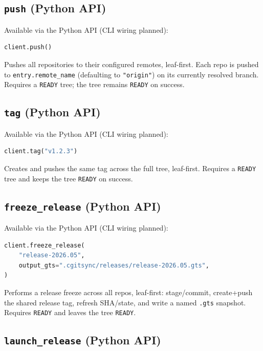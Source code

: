 \documentclass[11pt,a4paper]{article}
\begin{document}
\subsection{\texttt{push} (Python API)}

Available via the Python API (CLI wiring planned):

\begin{lstlisting}[language=Python]
client.push()
\end{lstlisting}

Pushes all repositories to their configured remotes, leaf-first.  Each repo
is pushed to \texttt{entry.remote\_name} (defaulting to \texttt{"origin"}) on
its currently resolved branch.  Requires a \texttt{READY} tree; the tree
remains \texttt{READY} on success.

\subsection{\texttt{tag} (Python API)}

Available via the Python API (CLI wiring planned):

\begin{lstlisting}[language=Python]
client.tag("v1.2.3")
\end{lstlisting}

Creates and pushes the same tag across the full tree, leaf-first. Requires a
\texttt{READY} tree and keeps the tree \texttt{READY} on success.

\subsection{\texttt{freeze\_release} (Python API)}

Available via the Python API (CLI wiring planned):

\begin{lstlisting}[language=Python]
client.freeze_release(
    "release-2026.05",
    output_gts=".cgitsync/releases/release-2026.05.gts",
)
\end{lstlisting}

Performs a release freeze across all repos, leaf-first: stage/commit,
create+push the shared release tag, refresh SHA/state, and write a named
\texttt{.gts} snapshot. Requires \texttt{READY} and leaves the tree
\texttt{READY}.

\subsection{\texttt{launch\_release} (Python API)}
\end{document}
